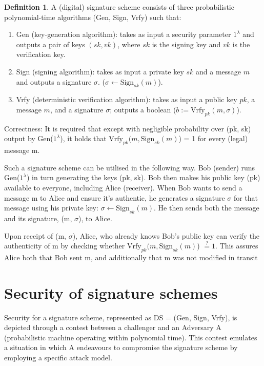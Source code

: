 \documentclass[]{final_report}
\theoremstyle{definition}
\newtheorem{definition}{Definition}[chapter]
\begin{document}
\begin{definition}
\label{def:digital signature}
A (digital) signature scheme consists of three probabilistic polynomial-time algorithms (Gen, Sign, Vrfy) such that:
\begin{enumerate}
    \item Gen (key-generation algorithm): takes as input a security parameter $1^\lambda$ and outputs a pair of keys $(sk ,vk)$, where $sk$ is the signing key and $vk$ is the verification key.
    \item Sign (signing algorithm): takes as input a private key $sk$ and a message $m$ and outputs a signature $\sigma$. ($\sigma \leftarrow \text{Sign}_{sk}(m)$).
    \item Vrfy (deterministic verification algorithm):  takes as input a public key $pk$, a message $m$, and a signature $\sigma$; outputs a boolean ($b := \text{Vrfy}_{pk}(m, \sigma)$).
\end{enumerate}
\end{definition}




Correctness: It is required that except with negligible probability over (pk, sk) output by Gen($1^\lambda$), it holds that $\text{Vrfy}_{pk} (m, \text{Sign}_{sk}(m)$) = 1 for every (legal) message m. 

Such a signature scheme can be utilised in the following way. 
Bob (sender) runs Gen($1^\lambda$) in turn generating the keys (pk, sk). Bob then makes his public key (pk) available to everyone, including Alice (receiver). 
When Bob wants to send a message m to Alice and ensure it's authentic, he generates a signature $\sigma$ for that message using his private key: $\sigma \leftarrow \text{Sign}_{sk}(m)$. He then sends both the message and its signature, (m, $\sigma$), to Alice.

Upon receipt of (m, $\sigma$), Alice, who already knows Bob's public key can verify the authenticity of m by checking whether $\text{Vrfy}_{pk} (m, \text{Sign}_{sk}(m)$) $\stackrel{?}{=} 1$. This assures Alice both that Bob sent m, and additionally that m was not modified in transit

\section{Security of signature schemes}
Security for a signature scheme, represented as DS = (Gen, Sign, Vrfy), is depicted through a contest between a challenger and an Adversary A (probabilistic machine operating within polynomial time). This contest emulates a situation in which A endeavours to compromise the signature scheme by employing a specific attack model. 
\end{document}
